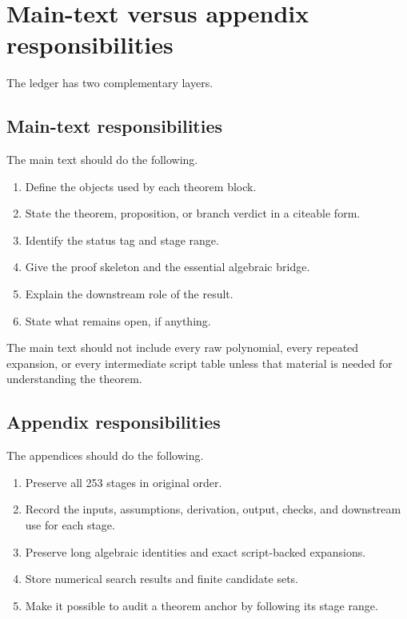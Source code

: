 \section{Main-text versus appendix responsibilities}

The ledger has two complementary layers.

\subsection{Main-text responsibilities}

The main text should do the following.
\begin{enumerate}[leftmargin=2.2em]
  \item Define the objects used by each theorem block.
  \item State the theorem, proposition, or branch verdict in a citeable form.
  \item Identify the status tag and stage range.
  \item Give the proof skeleton and the essential algebraic bridge.
  \item Explain the downstream role of the result.
  \item State what remains open, if anything.
\end{enumerate}

The main text should not include every raw polynomial, every repeated expansion, or every intermediate script table unless that material is needed for understanding the theorem.

\subsection{Appendix responsibilities}

The appendices should do the following.
\begin{enumerate}[leftmargin=2.2em]
  \item Preserve all 253 stages in original order.
  \item Record the inputs, assumptions, derivation, output, checks, and downstream use for each stage.
  \item Preserve long algebraic identities and exact script-backed expansions.
  \item Store numerical search results and finite candidate sets.
  \item Make it possible to audit a theorem anchor by following its stage range.
\end{enumerate}

